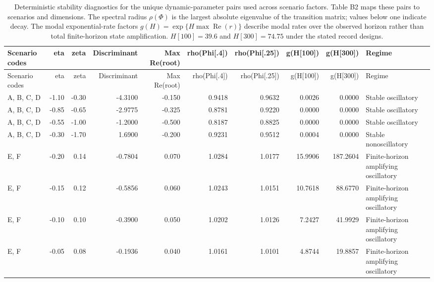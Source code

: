 \documentclass[
]{article}
\begin{document}
\begin{landscape}\footnotesize\setlength{\tabcolsep}{3pt}

\begin{longtable}[t]{lrrrrrrrrp{1.30in}}
\caption{Deterministic stability diagnostics for the unique dynamic-parameter pairs used across scenario factors. Table B2 maps these pairs to scenarios and dimensions. The spectral radius $\rho(\Phi)$ is the largest absolute eigenvalue of the transition matrix; values below one indicate decay. The modal exponential-rate factors $g(H)=\exp\{H\max\operatorname{Re}(r)\}$ describe modal rates over the observed horizon rather than total finite-horizon state amplification. $H[100]=39.6$ and $H[300]=74.75$ under the stated record designs.}\\
\toprule
Scenario codes & eta & zeta & Discriminant & Max Re(root) & rho(Phi[.4]) & rho(Phi[.25]) & g(H[100]) & g(H[300]) & Regime\\
\midrule
\endfirsthead
\toprule
Scenario codes & eta & zeta & Discriminant & Max Re(root) & rho(Phi[.4]) & rho(Phi[.25]) & g(H[100]) & g(H[300]) & Regime\\
\midrule
\endhead
A, B, C, D & -1.10 & -0.30 & -4.3100 & -0.150 & 0.9418 & 0.9632 & 0.0026 & 0.0000 & Stable oscillatory\\
A, B, C, D & -0.85 & -0.65 & -2.9775 & -0.325 & 0.8781 & 0.9220 & 0.0000 & 0.0000 & Stable oscillatory\\
A, B, C, D & -0.55 & -1.00 & -1.2000 & -0.500 & 0.8187 & 0.8825 & 0.0000 & 0.0000 & Stable oscillatory\\
A, B, C, D & -0.30 & -1.70 & 1.6900 & -0.200 & 0.9231 & 0.9512 & 0.0004 & 0.0000 & Stable nonoscillatory\\
E, F & -0.20 & 0.14 & -0.7804 & 0.070 & 1.0284 & 1.0177 & 15.9906 & 187.2604 & Finite-horizon amplifying oscillatory\\
\addlinespace
E, F & -0.15 & 0.12 & -0.5856 & 0.060 & 1.0243 & 1.0151 & 10.7618 & 88.6770 & Finite-horizon amplifying oscillatory\\
E, F & -0.10 & 0.10 & -0.3900 & 0.050 & 1.0202 & 1.0126 & 7.2427 & 41.9929 & Finite-horizon amplifying oscillatory\\
E, F & -0.05 & 0.08 & -0.1936 & 0.040 & 1.0161 & 1.0101 & 4.8744 & 19.8857 & Finite-horizon amplifying oscillatory\\
\bottomrule
\end{longtable}
\end{landscape}

\newpage
\end{document}

